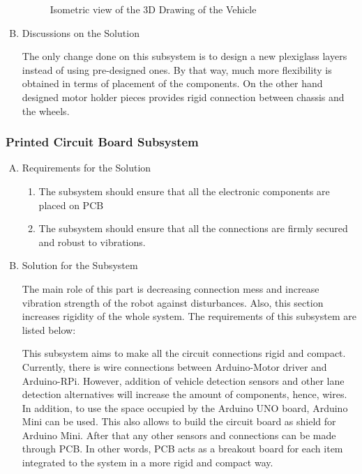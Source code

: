 \documentclass[a4paper,12pt]{article}
\begin{document}
\begin{enumerate}[A.]
\begin{figure}[h]
\caption{Isometric view of the 3D Drawing of the Vehicle \label{fig:chassis} }

\end{figure}

\item {Discussions on the Solution}

The only change done on this subsystem is to design a new plexiglass layers instead of using pre-designed ones. By that way, much more flexibility is obtained in terms of placement of the components. On the other hand designed motor holder pieces provides rigid connection between chassis and the wheels.  

\end{enumerate}





\subsubsection{Printed Circuit Board Subsystem}


\begin{enumerate}[A.]

\item {Requirements for the Solution}


\begin{enumerate}[1)]

\item The subsystem should ensure that all the electronic components are placed on PCB

\item The subsystem should ensure that all the connections are firmly secured and robust to vibrations.

\end{enumerate} 


\item {Solution for the Subsystem}


The main role of this part is decreasing connection mess and increase vibration strength of the robot against disturbances. Also, this section increases rigidity of the whole system. The requirements of this subsystem are listed below:	


This subsystem aims to make all the circuit connections rigid and compact. Currently, there is wire connections between Arduino-Motor driver and Arduino-RPi. However, addition of vehicle detection sensors and other lane detection alternatives will increase the amount of components, hence, wires. In addition, to use the space occupied by the Arduino UNO board, Arduino Mini can be used. This also allows to build the circuit board as shield for Arduino Mini. After that any other sensors and connections can be made through PCB. In other words, PCB acts as a breakout board for each item integrated to the system in a more rigid and compact way.



\end{enumerate}	
\end{document}
